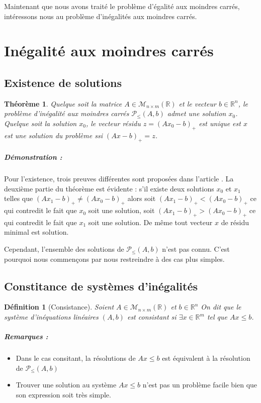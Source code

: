 \documentclass[10pt,a4paper]{article}
\newtheorem{thm}{Théorème}
\newtheorem{mydef}{Définition}
\begin{document}
Maintenant que nous avons traité le problème d'égalité aux moindres carrés, intéressons nous au problème d'inégalités aux moindres carrés.

\section{Inégalité aux moindres carrés}

\subsection{Existence de solutions}

\begin{thm}
  Quelque soit la matrice $A \in \mathcal{M}_{n \times m}(\mathbb{R})$ et le vecteur $b \in \mathbb{R}^n$, le problème d'inégalité aux moindres carrés $\mathcal{P}_{\leq}(A, b)$ admet une solution $x_0$.
  Quelque soit la solution $x_0$, le vecteur résidu $z = (Ax_0 - b)_+$ est unique est $x$ est une solution du problème ssi $(Ax - b)_+ = z$.
\end{thm}
\subparagraph{Démonstration :}
Pour l'existence, trois preuves différentes sont proposées dans l'article \cite{LSCHUP}.
La deuxième partie du théorème est évidente : s'il existe deux solutions $x_0$ et $x_1$ telles que $(Ax_1 - b)_+ \neq (Ax_0 - b)_+$ alors soit $(Ax_1 - b)_+ < (Ax_0 - b)_+$ ce qui contredit le fait que $x_0$ soit une solution, soit $(Ax_1 - b)_+ > (Ax_0 - b)_+$ ce qui contredit le fait que $x_1$ soit une solution.
De même tout vecteur $x$ de résidu minimal est solution.

Cependant, l'ensemble des solutions de $\mathcal{P}_{\leq}(A, b)$ n'est pas connu.
C'est pourquoi nous commençons par nous restreindre à des cas plus simples.

\subsection{Constitance de systèmes d'inégalités}
\begin{mydef}[Consistance]
Soient $A \in \mathcal{M}_{n \times m}(\mathbb{R})$ et $b \in \mathbb{R}^n$
On dit que le système d'inéquations linéaires $(A,b)$ est consistant si $\exists x \in \mathbb{R}^m$ tel que $Ax \le b$.
\end{mydef}
\subparagraph{Remarques :}
\begin{itemize}
  \item Dans le cas consitant, la résolutions de $Ax \leq b$ est équivalent à la résolution de $\mathcal{P}_{\leq}(A, b)$
  \item Trouver une solution au système $Ax \leq b$ n'est pas un problème facile bien que son expression soit très simple.
\end{itemize}
\end{document}

